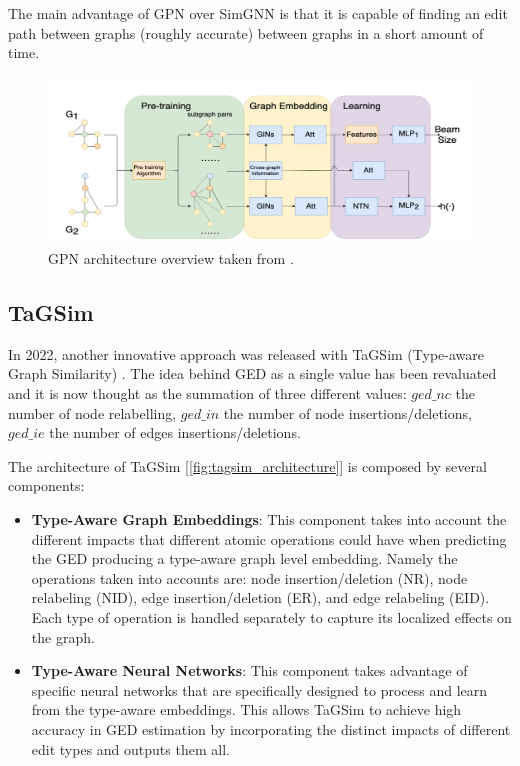 \documentclass[../Thesis.tex]{subfiles}
\begin{document}
	The main advantage of GPN over SimGNN is that it is capable of finding an edit path between graphs (roughly accurate) between graphs in a short amount of time.
	
	\begin{figure}[H]
		\centering
		\includegraphics[width=\textwidth]{Images/gpn_architecture.png}
		\caption{GPN architecture overview taken from \cite{noah__neural_optimized_a*_search_algorithm_for_graph_edit_distance_computation}.}
		\label{fig:gpn_architecture}
	\end{figure}
	
	
	\subsection{TaGSim}
	\label{sec:tagsim}
	
	In 2022, another innovative approach was released with TaGSim (Type-aware Graph Similarity) \cite{TaGSim_type_aware_graph_similarity_learning_and_computation}. The idea behind GED as a single value has been revaluated and it is now thought as the summation of three different values: $ged\_nc$ the number of node relabelling, $ged\_in$ the number of node insertions/deletions, $ged\_ie$ the number of edges insertions/deletions. 
	
	The architecture of TaGSim [\autoref{fig:tagsim_architecture}] is composed by several components:
	
	\begin{itemize}
		\item \textbf{Type-Aware Graph Embeddings}: This component takes into account the different impacts that different atomic operations could have when predicting the GED producing a type-aware graph level embedding. Namely the operations taken into accounts are: node insertion/deletion (NR), node relabeling (NID), edge insertion/deletion (ER), and edge relabeling (EID). Each type of operation is handled separately to capture its localized effects on the graph.
		\item \textbf{Type-Aware Neural Networks}: This component takes advantage of specific neural networks that are specifically designed to process and learn from the type-aware embeddings. This allows TaGSim to achieve high accuracy in GED estimation by incorporating the distinct impacts of different edit types and outputs them all.
	\end{itemize}
	
\end{document}
